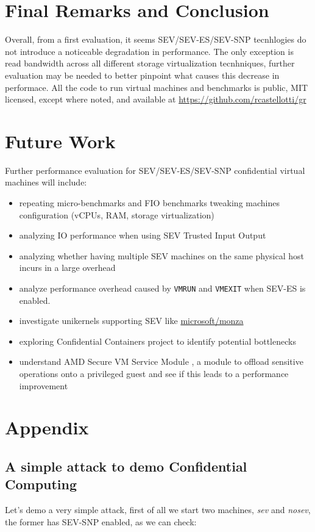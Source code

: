 \documentclass[twocolumn]{article}
\begin{document}
\section{Final Remarks and Conclusion}
Overall, from a first evaluation, it seems SEV/SEV-ES/SEV-SNP tecnhlogies do not introduce a noticeable degradation in performance. The only exception is read bandwidth across all different storage virtualization tecnhniques, further evaluation may be needed to better pinpoint what causes this decrease in performace.
All the code to run virtual machines and benchmarks is public, MIT licensed, except where noted, and available at \href{https://github.com/rcastellotti/gr}{https://github.com/rcastellotti/gr}

\section{Future Work}
Further performance evaluation for SEV/SEV-ES/SEV-SNP confidential virtual machines will include:

\begin{itemize}
    \item repeating micro-benchmarks and FIO benchmarks tweaking machines configuration (vCPUs, RAM, storage virtualization)
    \item analyzing IO performance when using SEV Trusted Input Output \cite{tio}
    \item analyzing whether having multiple SEV machines on the same physical host incurs in a large overhead
    \item analyze performance overhead caused by \texttt{VMRUN} and \texttt{VMEXIT} when SEV-ES is enabled.
    \item investigate unikernels supporting SEV like \href{https://github.com/microsoft/monza}{microsoft/monza}
    \item exploring Confidential Containers \cite{coco} project to identify potential bottlenecks
    \item understand AMD Secure VM Service Module \cite{svsm}, a module to offload sensitive operations onto a privileged guest and see if this leads to a performance improvement
\end{itemize}

    
\printbibliography
\appendix

\section{Appendix}
\subsection{A simple attack to demo Confidential Computing}
Let's demo a very simple attack, first of all we start two machines, \textit{sev} and \textit{nosev}, the former has SEV-SNP enabled, as we can check:
\end{document}
